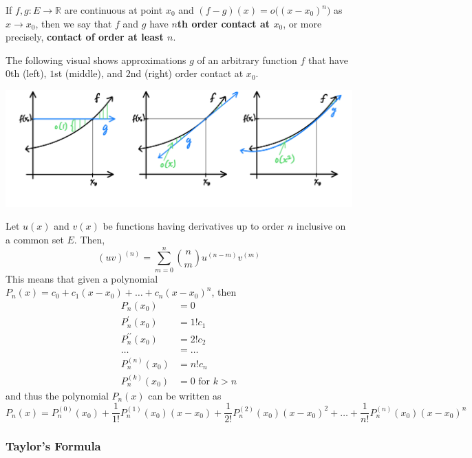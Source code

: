   \begin{definition}
    If $f, g: E \longrightarrow \mathbb{R}$ are continuous at point $x_0$ and $(f - g) (x) = o\big( (x - x_0)^n \big)$ as $x \rightarrow x_0$, then we say that $f$ and $g$ have \textbf{$n$th order contact at $x_0$}, or more precisely, \textbf{contact of order at least $n$}. 

    The following visual shows approximations $g$ of an arbitrary function $f$ that have $0$th (left), $1$st (middle), and $2$nd (right) order contact at $x_0$. 
    \begin{center}
        \includegraphics[scale=0.25]{img/nth_order_contact.PNG}
    \end{center}
  \end{definition}

  \begin{lemma}
    Let $u(x)$ and $v(x)$ be functions having derivatives up to order $n$ inclusive on a common set $E$. Then, 
    \[(uv)^{(n)} = \sum_{m = 0}^n \binom{n}{m} u^{(n-m)} v^{(m)}\]
    This means that given a polynomial $P_n (x) = c_0 + c_1 (x - x_0) + \ldots + c_n (x - x_0)^n$, then 
    \begin{align*}
        P_n(x_0) & = 0 \\
        P_n^\prime (x_0) & = 1! c_1 \\
        P_n^{\prime\prime} (x_0) & = 2! c_2 \\
        \ldots & = \ldots \\
        P_n^{(n)} (x_0) & = n! c_n \\
        P_n^{(k)} (x_0) & = 0 \text{ for } k > n
    \end{align*}
    and thus the polynomial $P_n (x)$ can be written as
    \[P_n (x) = P_n^{(0)} (x_0) + \frac{1}{1!} P_n^{(1)} (x_0) (x-x_0) + \frac{1}{2!} P_n^{(2)} (x_0) (x-x_0)^2 + \ldots + \frac{1}{n!} P_n^{(n)} (x_0) (x-x_0)^n\]
  \end{lemma}

\subsubsection{Taylor's Formula}

